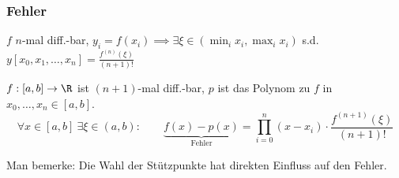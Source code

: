 \subsubsection{Fehler}

\inlinetheorem $f$ $n$-mal diff.-bar, $y_i = f(x_i) \implies \exists \xi \in (\min_i x_i, \max_i x_i)$ s.d. $y[x_0,x_1,\ldots,x_n] = \frac{f^{(n)}(\xi)}{(n+1)!}$

 $f: [a,b] \to \R$ ist $(n+1)$-mal diff.-bar, $p$ ist das Polynom zu $f$ in $x_0,\ldots,x_n \in [a,b]$. 
$$
    \forall x \in [a,b]\ \exists \xi \in (a,b):\quad\quad \underbrace{f(x)-p(x)}_{\text{Fehler}} = \prod_{i=0}^{n}(x-x_i)\cdot\frac{f^{(n+1)}(\xi)}{(n+1)!}
$$

Man bemerke: Die Wahl der Stützpunkte hat direkten Einfluss auf den Fehler.


